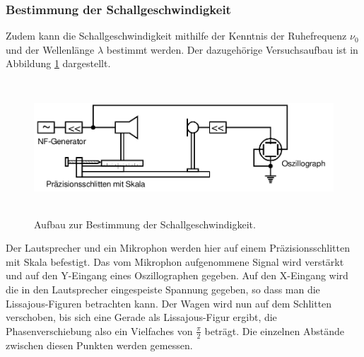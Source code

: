 \subsubsection{Bestimmung der Schallgeschwindigkeit}
\label{sec:schall}
Zudem kann die Schallgeschwindigkeit mithilfe der Kenntnis der Ruhefrequenz $\nu_0$ und der Wellenlänge $\lambda$ bestimmt werden.
Der dazugehörige Versuchsaufbau ist in Abbildung \ref{tfig:4} dargestellt.
\begin{figure}
  \centering
  \includegraphics[height=5cm]{aufbau4.png}
  \caption{Aufbau zur Bestimmung der Schallgeschwindigkeit. \cite{sample}}
  \label{tfig:4}
\end{figure}
Der Lautsprecher und ein Mikrophon werden hier auf einem Präzisionsschlitten mit Skala befestigt. Das vom Mikrophon aufgenommene Signal wird verstärkt und auf den Y-Eingang eines Oszillographen gegeben.
Auf den X-Eingang wird die in den Lautsprecher eingespeiste Spannung gegeben, so dass man die Lissajous-Figuren betrachten kann.
Der Wagen wird nun auf dem Schlitten verschoben, bis sich eine Gerade als Lissajous-Figur ergibt, die Phasenverschiebung also ein Vielfaches von $\frac{\pi}{2}$ beträgt.
Die einzelnen Abstände zwischen diesen Punkten werden gemessen.
